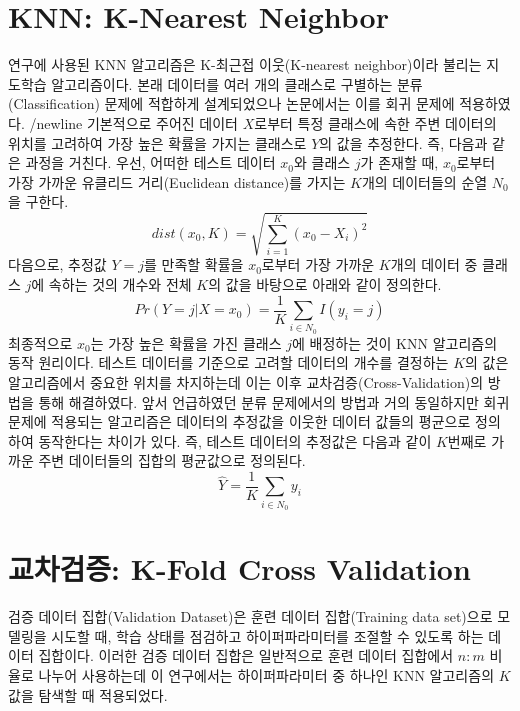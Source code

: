 \documentclass{article}
\begin{document}
\section{KNN: K-Nearest Neighbor}
연구에 사용된 KNN 알고리즘은 K-최근접 이웃(K-nearest neighbor)이라 불리는 지도학습 알고리즘이다. 본래 데이터를 여러 개의 클래스로 구별하는 분류(Classification) 문제에 적합하게 설계되었으나 논문에서는 이를 회귀 문제에 적용하였다. /newline
기본적으로 주어진 데이터 $X$로부터 특정 클래스에 속한 주변 데이터의 위치를 고려하여 가장 높은 확률을 가지는 클래스로 $Y$의 값을 추정한다. 즉, 다음과 같은 과정을 거친다. 우선, 어떠한 테스트 데이터 $x_0$와 클래스 $j$가 존재할 때, $x_0$로부터 가장 가까운 유클리드 거리(Euclidean distance)를 가지는 $K$개의 데이터들의 순열 $N_0$을 구한다.
\begin{equation}
dist(x_0, K)=\sqrt{\sum_{i=1}^{K}(x_0-X_i)^2}
\end{equation}
다음으로, 추정값 $Y=j$를 만족할 확률을 $x_0$로부터 가장 가까운 $K$개의 데이터 중 클래스 $j$에 속하는 것의 개수와 전체 $K$의 값을 바탕으로 아래와 같이 정의한다.
\begin{equation}
Pr(Y=j | X=x_0)=\frac{1}{K}\sum_{i \in N_0}I(y_i=j)
\end{equation}
최종적으로 $x_0$는 가장 높은 확률을 가진 클래스 $j$에 배정하는 것이 KNN 알고리즘의 동작 원리이다. 테스트 데이터를 기준으로 고려할 데이터의 개수를 결정하는 $K$의 값은 알고리즘에서 중요한 위치를 차지하는데 이는 이후 교차검증(Cross-Validation)의 방법을 통해 해결하였다.
앞서 언급하였던 분류 문제에서의 방법과 거의 동일하지만 회귀 문제에 적용되는 알고리즘은 데이터의 추정값을 이웃한 데이터 값들의 평균으로 정의하여 동작한다는 차이가 있다. 즉, 테스트 데이터의 추정값은 다음과 같이 $K$번째로 가까운 주변 데이터들의 집합의 평균값으로 정의된다.
\begin{equation}
\hat{Y}=\frac{1}{K}\sum_{i \in N_0}y_i
\end{equation}

\section{교차검증: K-Fold Cross Validation}
검증 데이터 집합(Validation Dataset)은 훈련 데이터 집합(Training data set)으로 모델링을 시도할 때, 학습 상태를 점검하고 하이퍼파라미터를 조절할 수 있도록 하는 데이터 집합이다. 이러한 검증 데이터 집합은 일반적으로 훈련 데이터 집합에서 $n:m$ 비율로 나누어 사용하는데 이 연구에서는 하이퍼파라미터 중 하나인 KNN 알고리즘의 $K$값을 탐색할 때 적용되었다. \newline
\end{document}
